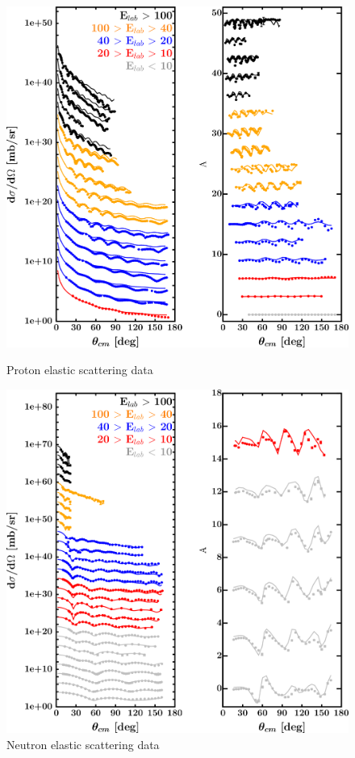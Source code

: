\begin{figure}[H]
    \centering
    \begin{minipage}{0.45\textwidth}
        \centering
        \includegraphics[width=1.0\textwidth]{figures/pb208_protonElastic.png}
        \caption{Proton elastic scattering data}
        \label{DOMFitData_pb208_proton_elastic}
    \end{minipage}\hfill
    \begin{minipage}{0.45\textwidth}
        \centering
        \includegraphics[width=1.0\textwidth]{figures/pb208_neutronElastic.png}
        \caption{Neutron elastic scattering data}
        \label{DOMFitData_pb208_neutron_elastic}
    \end{minipage}
\end{figure}

